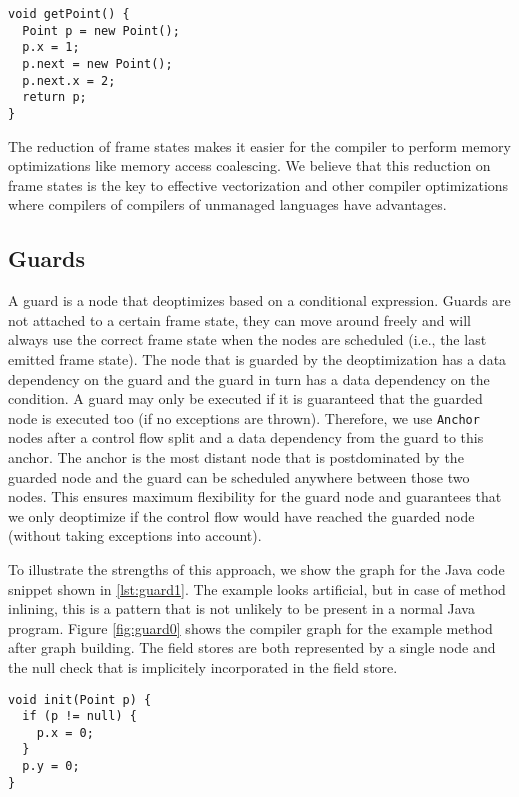 \documentclass[twocolumn]{svjour3}
\begin{document}
\begin{lstlisting}[label=lst:escape1, caption=Example method that needs no frame state., captionpos=b]
void getPoint() {
  Point p = new Point();
  p.x = 1;
  p.next = new Point();
  p.next.x = 2;
  return p;
}
\end{lstlisting}

The reduction of frame states makes it easier for the compiler to perform memory optimizations like memory access coalescing.
We believe that this reduction on frame states is the key to effective vectorization and other compiler optimizations where compilers of compilers of unmanaged languages have advantages.

\subsection{Guards}
A guard is a node that deoptimizes based on a conditional expression.
Guards are not attached to a certain frame state, they can move around freely and will always use the correct frame state when the nodes are scheduled (i.e., the last emitted frame state).
The node that is guarded by the deoptimization has a data dependency on the guard and the guard in turn has a data dependency on the condition.
A guard may only be executed if it is guaranteed that the guarded node is executed too (if no exceptions are thrown).
Therefore, we use \texttt{Anchor} nodes after a control flow split and a data dependency from the guard to this anchor.
The anchor is the most distant node that is postdominated by the guarded node and the guard can be scheduled anywhere between those two nodes.
This ensures maximum flexibility for the guard node and guarantees that we only deoptimize if the control flow would have reached the guarded node (without taking exceptions into account).

To illustrate the strengths of this approach, we show the graph for the Java code snippet shown in \ref{lst:guard1}.
The example looks artificial, but in case of method inlining, this is a pattern that is not unlikely to be present in a normal Java program.
Figure \ref{fig:guard0} shows the compiler graph for the example method after graph building.
The field stores are both represented by a single node and the null check that is implicitely incorporated in the field store.

\begin{lstlisting}[label=lst:guard1, caption=Example method that demonstrates the strengths of modelling the guards explicitely., captionpos=b]
void init(Point p) {
  if (p != null) {
    p.x = 0;
  }
  p.y = 0;
}
\end{lstlisting}
\end{document}
